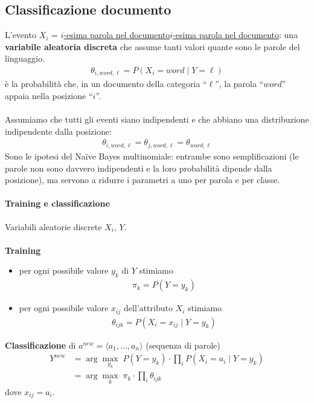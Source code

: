 \documentclass[a4paper,12pt]{article}
\let\mathunderline\underline
\renewcommand{\underline}[1]{\ifmmode\mathunderline{#1}\else\uline{#1}\fi}   %
\begin{document}
\subsection{Classificazione documento}
L'evento $X_i$ = \underline{$i$-esima parola nel documento}: una \textbf{variabile aleatoria discreta} che assume tanti valori quante sono le parole del linguaggio.
\begin{align*}
    \theta_{i,word,\ell} = P(X_i = word \mid Y=\ell)
\end{align*}
è la probabilità che, in un documento della categoria ``$\ell$'', la parola ``$word$'' appaia nella posizione ``$i$''.\\
\vspace{1px}\\
Assumiamo che tutti gli eventi siano indipendenti e che abbiano una distribuzione indipendente dalla posizione:
\begin{align*}
    \theta_{i,word,\ell} = \theta_{j,word,\ell} = \theta_{word,\ell}
\end{align*}
Sono le ipotesi del Naïve Bayes multinomiale: entrambe sono semplificazioni (le parole non sono davvero indipendenti e la loro probabilità dipende dalla posizione), ma servono a ridurre i parametri a uno per parola e per classe.
\paragraph{Training e classificazione} Variabili aleatorie discrete $X_i$, $Y$.\\
\vspace{1px}\\
\textbf{Training}
\begin{itemize}
    \item per ogni possibile valore $y_k$ di $Y$ stimiamo
    \begin{align*}
        \pi_k = P(Y=y_k)
    \end{align*}
    \item per ogni possibile valore $x_{ij}$ dell'attributo $X_i$ stimiamo
    \begin{align*}
        \theta_{ijk} = P(X_i=x_{ij} \mid Y=y_k)
    \end{align*}
\end{itemize}
\textbf{Classificazione} di $a^{new}=\langle a_1,\dots,a_n\rangle$ (sequenza di parole)
\begin{align*}
    Y^{new} &= \arg\max_{y_k}\; P(Y=y_k)\cdot\prod_i P(X_i=a_i \mid Y=y_k)\\
            &= \arg\max_{k}\; \pi_k\cdot\prod_i \theta_{ijk}
\end{align*}
dove $x_{ij}=a_i$.
\end{document}
